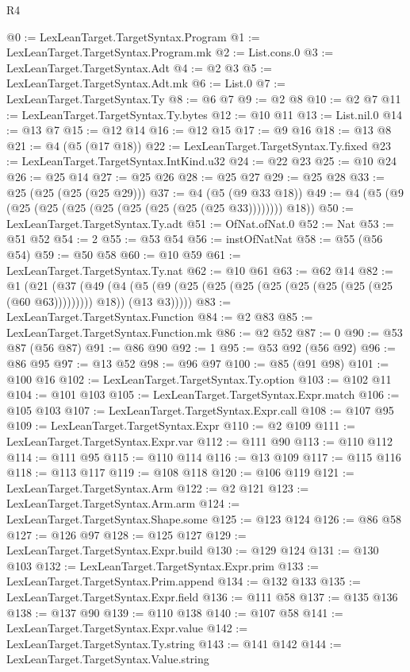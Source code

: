 \begin{lexlean}{R4}
\begin{coremodule}
@0 := LexLeanTarget.TargetSyntax.Program
@1 := LexLeanTarget.TargetSyntax.Program.mk
@2 := List.cons.{0}
@3 := LexLeanTarget.TargetSyntax.Adt
@4 := @2 @3
@5 := LexLeanTarget.TargetSyntax.Adt.mk
@6 := List.{0}
@7 := LexLeanTarget.TargetSyntax.Ty
@8 := @6 @7
@9 := @2 @8
@10 := @2 @7
@11 := LexLeanTarget.TargetSyntax.Ty.bytes
@12 := @10 @11
@13 := List.nil.{0}
@14 := @13 @7
@15 := @12 @14
@16 := @12 @15
@17 := @9 @16
@18 := @13 @8
@21 := @4 (@5 (@17 @18))
@22 := LexLeanTarget.TargetSyntax.Ty.fixed
@23 := LexLeanTarget.TargetSyntax.IntKind.u32
@24 := @22 @23
@25 := @10 @24
@26 := @25 @14
@27 := @25 @26
@28 := @25 @27
@29 := @25 @28
@33 := @25 (@25 (@25 (@25 @29)))
@37 := @4 (@5 (@9 @33 @18))
@49 := @4 (@5 (@9 (@25 (@25 (@25 (@25 (@25 (@25 (@25 (@25 @33)))))))) @18))
@50 := LexLeanTarget.TargetSyntax.Ty.adt
@51 := OfNat.ofNat.{0}
@52 := Nat
@53 := @51 @52
@54 := 2
@55 := @53 @54
@56 := instOfNatNat
@58 := @55 (@56 @54)
@59 := @50 @58
@60 := @10 @59
@61 := LexLeanTarget.TargetSyntax.Ty.nat
@62 := @10 @61
@63 := @62 @14
@82 := @1
    (@21
      (@37
        (@49
          (@4 (@5 (@9 (@25 (@25 (@25 (@25 (@25 (@25 (@25 (@25 (@60 @63))))))))) @18)) (@13 @3)))))
@83 := LexLeanTarget.TargetSyntax.Function
@84 := @2 @83
@85 := LexLeanTarget.TargetSyntax.Function.mk
@86 := @2 @52
@87 := 0
@90 := @53 @87 (@56 @87)
@91 := @86 @90
@92 := 1
@95 := @53 @92 (@56 @92)
@96 := @86 @95
@97 := @13 @52
@98 := @96 @97
@100 := @85 (@91 @98)
@101 := @100 @16
@102 := LexLeanTarget.TargetSyntax.Ty.option
@103 := @102 @11
@104 := @101 @103
@105 := LexLeanTarget.TargetSyntax.Expr.match
@106 := @105 @103
@107 := LexLeanTarget.TargetSyntax.Expr.call
@108 := @107 @95
@109 := LexLeanTarget.TargetSyntax.Expr
@110 := @2 @109
@111 := LexLeanTarget.TargetSyntax.Expr.var
@112 := @111 @90
@113 := @110 @112
@114 := @111 @95
@115 := @110 @114
@116 := @13 @109
@117 := @115 @116
@118 := @113 @117
@119 := @108 @118
@120 := @106 @119
@121 := LexLeanTarget.TargetSyntax.Arm
@122 := @2 @121
@123 := LexLeanTarget.TargetSyntax.Arm.arm
@124 := LexLeanTarget.TargetSyntax.Shape.some
@125 := @123 @124
@126 := @86 @58
@127 := @126 @97
@128 := @125 @127
@129 := LexLeanTarget.TargetSyntax.Expr.build
@130 := @129 @124
@131 := @130 @103
@132 := LexLeanTarget.TargetSyntax.Expr.prim
@133 := LexLeanTarget.TargetSyntax.Prim.append
@134 := @132 @133
@135 := LexLeanTarget.TargetSyntax.Expr.field
@136 := @111 @58
@137 := @135 @136
@138 := @137 @90
@139 := @110 @138
@140 := @107 @58
@141 := LexLeanTarget.TargetSyntax.Expr.value
@142 := LexLeanTarget.TargetSyntax.Ty.string
@143 := @141 @142
@144 := LexLeanTarget.TargetSyntax.Value.string

\end{coremodule}
\end{lexlean}

